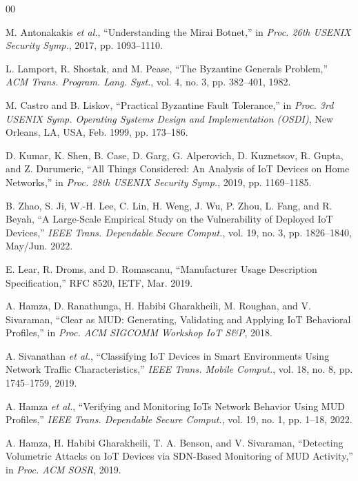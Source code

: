 \documentclass[journal]{IEEEtran}
\theoremstyle{definition}
\begin{document}
\setlength{\IEEEbibitemsep}{0pt}
\begin{thebibliography}{00}
\footnotesize

 M. Antonakakis \emph{et al.}, ``Understanding the Mirai Botnet,'' in
\emph{Proc. 26th USENIX Security Symp.}, 2017, pp. 1093--1110.

 L. Lamport, R. Shostak, and M. Pease, ``The Byzantine Generals Problem,'' \emph{ACM Trans. Program. Lang. Syst.}, vol. 4, no. 3, pp. 382--401, 1982.

 M. Castro and B. Liskov, ``Practical Byzantine Fault Tolerance,'' in \emph{Proc. 3rd USENIX Symp. Operating Systems Design and Implementation (OSDI)}, New Orleans, LA, USA, Feb. 1999, pp. 173--186.

 D. Kumar, K. Shen, B. Case, D. Garg, G. Alperovich, D. Kuznetsov, R. Gupta, and Z. Durumeric, ``All Things Considered: An Analysis of IoT Devices on Home Networks,'' in \emph{Proc. 28th USENIX Security Symp.}, 2019, pp. 1169--1185.

 B. Zhao, S. Ji, W.-H. Lee, C. Lin, H. Weng, J. Wu, P. Zhou, L. Fang, and R. Beyah, ``A Large-Scale Empirical Study on the Vulnerability of Deployed IoT Devices,'' \emph{IEEE Trans. Dependable Secure Comput.}, vol. 19, no. 3, pp. 1826--1840, May/Jun. 2022.

 E. Lear, R. Droms, and D. Romascanu, ``Manufacturer Usage Description
Specification,'' RFC 8520, IETF, Mar. 2019.

 A. Hamza, D. Ranathunga, H. Habibi Gharakheili, M. Roughan, and
V. Sivaraman, ``Clear as MUD: Generating, Validating and Applying IoT Behavioral
Profiles,'' in \emph{Proc. ACM SIGCOMM Workshop IoT S\&P}, 2018.

 A. Sivanathan \emph{et al.}, ``Classifying IoT Devices
in Smart Environments Using Network Traffic Characteristics,'' \emph{IEEE Trans. Mobile
Comput.}, vol. 18, no. 8, pp. 1745--1759, 2019.

 A. Hamza \emph{et al.}, ``Verifying and Monitoring IoTs Network
Behavior Using MUD Profiles,'' \emph{IEEE Trans. Dependable Secure Comput.}, vol. 19, no.
1, pp. 1--18, 2022.

 A. Hamza, H. Habibi Gharakheili, T. A. Benson, and V. Sivaraman,
``Detecting Volumetric Attacks on IoT Devices via SDN-Based Monitoring of MUD Activity,''
in \emph{Proc. ACM SOSR}, 2019.


\end{thebibliography}
\end{document}
